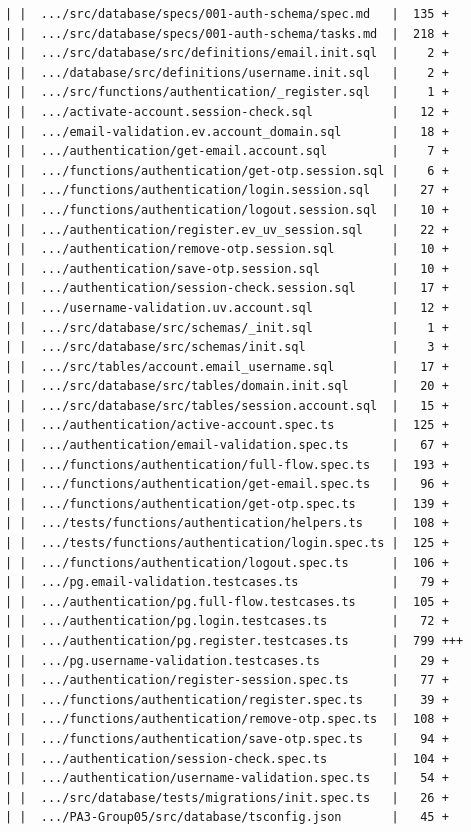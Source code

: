 \documentclass[12pt]{article}
\begin{document}
\begin{lstlisting}[numbers=none,breaklines=true]
| |  .../src/database/specs/001-auth-schema/spec.md   |  135 +
| |  .../src/database/specs/001-auth-schema/tasks.md  |  218 +
| |  .../src/database/src/definitions/email.init.sql  |    2 +
| |  .../database/src/definitions/username.init.sql   |    2 +
| |  .../src/functions/authentication/_register.sql   |    1 +
| |  .../activate-account.session-check.sql           |   12 +
| |  .../email-validation.ev.account_domain.sql       |   18 +
| |  .../authentication/get-email.account.sql         |    7 +
| |  .../functions/authentication/get-otp.session.sql |    6 +
| |  .../functions/authentication/login.session.sql   |   27 +
| |  .../functions/authentication/logout.session.sql  |   10 +
| |  .../authentication/register.ev_uv_session.sql    |   22 +
| |  .../authentication/remove-otp.session.sql        |   10 +
| |  .../authentication/save-otp.session.sql          |   10 +
| |  .../authentication/session-check.session.sql     |   17 +
| |  .../username-validation.uv.account.sql           |   12 +
| |  .../src/database/src/schemas/_init.sql           |    1 +
| |  .../src/database/src/schemas/init.sql            |    3 +
| |  .../src/tables/account.email_username.sql        |   17 +
| |  .../src/database/src/tables/domain.init.sql      |   20 +
| |  .../src/database/src/tables/session.account.sql  |   15 +
| |  .../authentication/active-account.spec.ts        |  125 +
| |  .../authentication/email-validation.spec.ts      |   67 +
| |  .../functions/authentication/full-flow.spec.ts   |  193 +
| |  .../functions/authentication/get-email.spec.ts   |   96 +
| |  .../functions/authentication/get-otp.spec.ts     |  139 +
| |  .../tests/functions/authentication/helpers.ts    |  108 +
| |  .../tests/functions/authentication/login.spec.ts |  125 +
| |  .../functions/authentication/logout.spec.ts      |  106 +
| |  .../pg.email-validation.testcases.ts             |   79 +
| |  .../authentication/pg.full-flow.testcases.ts     |  105 +
| |  .../authentication/pg.login.testcases.ts         |   72 +
| |  .../authentication/pg.register.testcases.ts      |  799 +++
| |  .../pg.username-validation.testcases.ts          |   29 +
| |  .../authentication/register-session.spec.ts      |   77 +
| |  .../functions/authentication/register.spec.ts    |   39 +
| |  .../functions/authentication/remove-otp.spec.ts  |  108 +
| |  .../functions/authentication/save-otp.spec.ts    |   94 +
| |  .../authentication/session-check.spec.ts         |  104 +
| |  .../authentication/username-validation.spec.ts   |   54 +
| |  .../src/database/tests/migrations/init.spec.ts   |   26 +
| |  .../PA3-Group05/src/database/tsconfig.json       |   45 +

\end{lstlisting}
\end{document}
